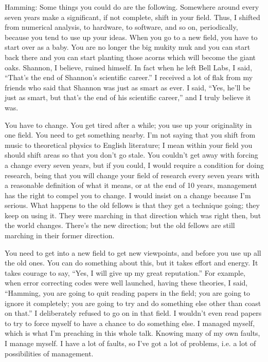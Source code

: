 \documentclass{article}
\begin{document}
Hamming: Some things you could do are the following. Somewhere around every seven years make a significant, if not complete, shift in your field. Thus, I shifted from numerical analysis, to hardware, to software, and so on, periodically, because you tend to use up your ideas. When you go to a new field, you have to start over as a baby. You are no longer the big mukity muk and you can start back there and you can start planting those acorns which will become the giant oaks. Shannon, I believe, ruined himself. In fact when he left Bell Labs, I said, ``That's the end of Shannon's scientific career.'' I received a lot of flak from my friends who said that Shannon was just as smart as ever. I said, ``Yes, he'll be just as smart, but that's the end of his scientific career,'' and I truly believe it was.

You have to change. You get tired after a while; you use up your originality in one field. You need to get something nearby. I'm not saying that you shift from music to theoretical physics to English literature; I mean within your field you should shift areas so that you don't go stale. You couldn't get away with forcing a change every seven years, but if you could, I would require a condition for doing research, being that you will change your field of research every seven years with a reasonable definition of what it means, or at the end of 10 years, management has the right to compel you to change. I would insist on a change because I'm serious. What happens to the old fellows is that they get a technique going; they keep on using it. They were marching in that direction which was right then, but the world changes. There's the new direction; but the old fellows are still marching in their former direction.

You need to get into a new field to get new viewpoints, and before you use up all the old ones. You can do something about this, but it takes effort and energy. It takes courage to say, ``Yes, I will give up my great reputation.'' For example, when error correcting codes were well launched, having these theories, I said, ``Hamming, you are going to quit reading papers in the field; you are going to ignore it completely; you are going to try and do something else other than coast on that.'' I deliberately refused to go on in that field. I wouldn't even read papers to try to force myself to have a chance to do something else. I managed myself, which is what I'm preaching in this whole talk. Knowing many of my own faults, I manage myself. I have a lot of faults, so I've got a lot of problems, i.e. a lot of possibilities of management.
\end{document}
